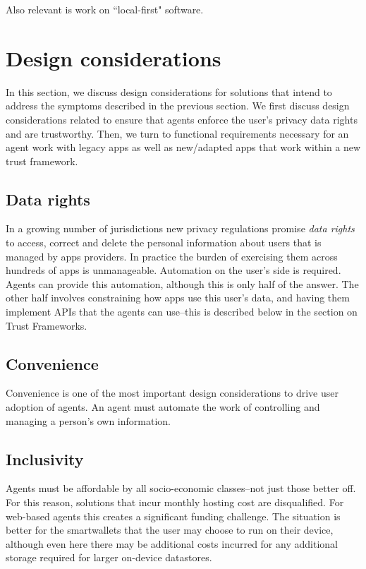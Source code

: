 \documentclass[11pt, oneside]{article}   	%
\begin{document}
Also relevant is work on ``local-first" software.\cite{Kleppmann2019}

\section{Design considerations} %

In this section, we discuss design considerations for solutions that intend to address the symptoms described in the previous section. We first discuss design considerations related to ensure that agents enforce the user's privacy data rights and are trustworthy. Then, we turn to functional requirements necessary for an agent work with legacy apps as well as new/adapted apps that work within a new trust framework.

\subsection{Data rights}

In a growing number of jurisdictions new privacy regulations promise \emph{data rights} to access, correct and delete the personal information about users that is managed by apps providers. In practice the burden of exercising them across hundreds of apps is unmanageable. Automation on the user's side is required. Agents can provide this automation, although this is only half of the answer. The other half involves constraining how apps use this user's data, and having them implement APIs that the agents can use--this is described below in the section on Trust Frameworks.

\subsection{Convenience}

Convenience is one of the most important design considerations to drive user adoption of agents. An agent must automate the work of controlling and managing a person's own information. 

\subsection{Inclusivity}

Agents must be affordable by all socio-economic classes--not just those better off. For this reason, solutions that incur monthly hosting cost are disqualified. For web-based agents this creates a significant funding challenge. The situation is better for the smartwallets that the user may choose to run on their device, although even here there may be additional costs incurred for any additional storage required for larger on-device datastores.
\end{document}
